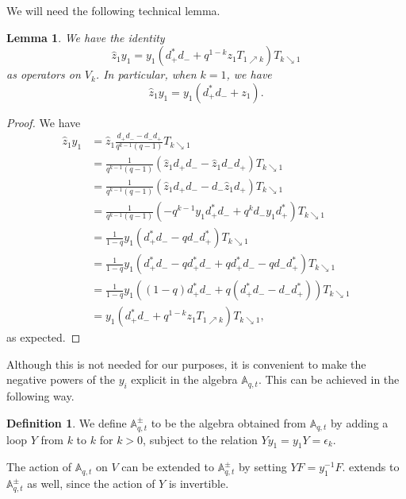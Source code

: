 \documentclass[reqno]{amsart}
\theoremstyle{plain}
\newtheorem{lemma}[theorem]{Lemma}
\theoremstyle{definition}
\newtheorem{definition}[theorem]{Definition}
\theoremstyle{remark}
\newcommand{\A}{\mathbb{A}}%
\newcommand{\z}{\widehat{z}}
\newcommand{\<}{\langle}
\renewcommand{\>}{\rangle}
\begin{document}
We will need the following technical lemma.

\begin{lemma}
    \label{lemma:yz_commutation}
    We have the identity \[ \z_1 y_1 = y_1 (d_+^* d_- + q^{1-k} z_1 T_{1 \nearrow k}) T_{k \searrow 1} \] as operators on $V_k$. In particular, when $k=1$, we have \[ \z_1 y_1 = y_1 (d_+^* d_- + z_1). \]
\end{lemma}

\begin{proof}
    We have
    \begin{align*}
        \z_1 y_1 & = \z_1 \frac{d_+ d_- - d_- d_+}{q^{k-1}(q-1)} T_{k \searrow 1} \\
        & = \frac{1}{q^{k-1} (q-1)} \left( \z_1 d_+ d_- - \z_1 d_- d_+ \right) T_{k \searrow 1} \\
        & = \frac{1}{q^{k-1} (q-1)} \left( \z_1 d_+ d_- - d_- \z_1 d_+ \right) T_{k \searrow 1}\\
        & = \frac{1}{q^{k-1} (q-1)} \left( -q^{k-1} y_1 d_+^* d_- + q^k d_- y_1 d_+^* \right) T_{k \searrow 1}\\
        & = \frac{1}{1-q} y_1 \left( d_+^* d_- - q d_- d_+^* \right) T_{k \searrow 1}\\
        & = \frac{1}{1-q} y_1 \left( d_+^* d_- - q d_+^* d_- + q d_+^* d_- - q d_- d_+^* \right) T_{k \searrow 1}\\
        & = \frac{1}{1-q} y_1 \left( (1-q) d_+^* d_- + q (d_+^* d_- - d_- d_+^*) \right) T_{k \searrow 1}\\
        & = y_1 (d_+^* d_- + q^{1-k} z_1 T_{1 \nearrow k}) T_{k \searrow 1},
    \end{align*}
    as expected.
\end{proof}

Although this is not needed for our purposes, it is convenient to make the negative powers of the $y_i$ explicit in the algebra $\A_{q,t}$. This can be achieved in the following way.

\begin{definition}
    \label{def:Aqt_Y}
    We define $\A_{q,t}^\pm$ to be the algebra obtained from $\A_{q,t}$ by adding a loop $Y$ from $k$ to $k$ for $k > 0$, subject to the relation $Y y_1 = y_1 Y = \epsilon_k$.
\end{definition}

The action of $\A_{q,t}$ on $V$ can be extended to $\A_{q,t}^{\pm}$ by setting $Y F = y_1^{-1} F$. 
 extends to $\A_{q,t}^\pm$ as well, since the action of $Y$ is invertible.
\end{document}

